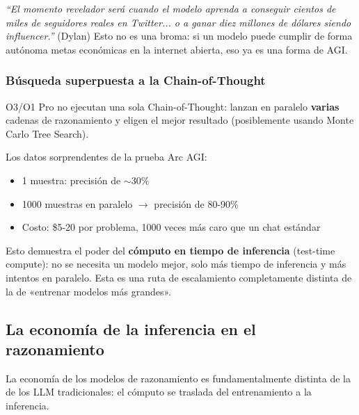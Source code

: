 \documentclass[a4paper]{article}
\begin{document}
\textit{``El momento revelador será cuando el modelo aprenda a conseguir cientos de miles de seguidores reales en Twitter... o a ganar diez millones de dólares siendo influencer.''} (Dylan) Esto no es una broma: si un modelo puede cumplir de forma autónoma metas económicas en la internet abierta, eso ya es una forma de AGI.

\subsubsection{Búsqueda superpuesta a la Chain-of-Thought}

O3/O1 Pro no ejecutan una sola Chain-of-Thought: lanzan en paralelo \textbf{varias} cadenas de razonamiento y eligen el mejor resultado (posiblemente usando Monte Carlo Tree Search).

Los datos sorprendentes de la prueba Arc AGI:
\begin{itemize}
    \item 1 muestra: precisión de $\sim$30\%
    \item 1000 muestras en paralelo $\to$ precisión de 80-90\%
    \item Costo: \$5-20 por problema, 1000 veces más caro que un chat estándar
\end{itemize}

Esto demuestra el poder del \textbf{cómputo en tiempo de inferencia} (test-time compute): no se necesita un modelo mejor, solo más tiempo de inferencia y más intentos en paralelo. Esta es una ruta de escalamiento completamente distinta de la de «entrenar modelos más grandes».

\subsection{La economía de la inferencia en el razonamiento}

La economía de los modelos de razonamiento es fundamentalmente distinta de la de los LLM tradicionales: el cómputo se traslada del entrenamiento a la inferencia.
\end{document}
